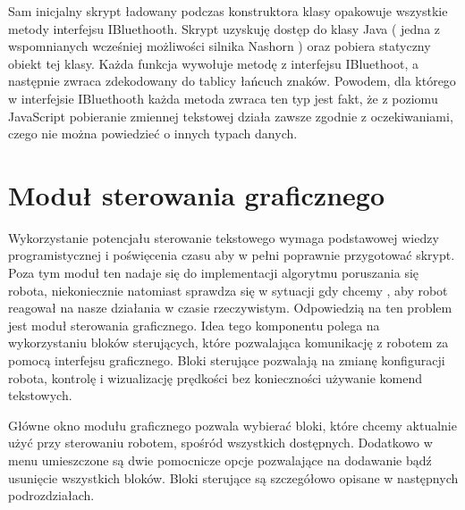 \documentclass[eng,printmode]{mgr}
\begin{document}
Sam inicjalny skrypt ładowany podczas konstruktora klasy opakowuje wszystkie metody interfejsu IBluethooth. Skrypt uzyskuję dostęp do klasy Java ( jedna z wspomnianych wcześniej możliwości silnika Nashorn ) oraz pobiera statyczny obiekt tej klasy. Każda funkcja wywołuje metodę z interfejsu  IBluethoot, a następnie zwraca zdekodowany do tablicy łańcuch znaków. Powodem, dla którego w interfejsie IBluethooth każda metoda zwraca ten typ jest fakt, że z poziomu JavaScript pobieranie zmiennej tekstowej działa zawsze zgodnie z oczekiwaniami, czego nie można powiedzieć o innych typach danych.

 \section{Moduł sterowania graficznego}

Wykorzystanie potencjału sterowanie tekstowego wymaga podstawowej wiedzy programistycznej i poświęcenia czasu aby w pełni poprawnie przygotować skrypt. Poza tym moduł ten nadaje się do implementacji algorytmu poruszania się robota, niekoniecznie natomiast sprawdza się w sytuacji gdy chcemy , aby robot reagował na nasze działania w czasie rzeczywistym. Odpowiedzią  na ten problem jest moduł sterowania graficznego. Idea tego komponentu polega na wykorzystaniu bloków sterujących, które pozwalająca komunikację z robotem za pomocą interfejsu graficznego. Bloki sterujące pozwalają na zmianę konfiguracji robota, kontrolę  i wizualizację prędkości bez konieczności używanie komend tekstowych. 

Główne okno modułu graficznego pozwala wybierać bloki, które chcemy aktualnie użyć przy sterowaniu robotem, spośród wszystkich dostępnych. Dodatkowo w menu umieszczone są dwie pomocnicze opcje pozwalające na dodawanie bądź usunięcie wszystkich bloków. Bloki sterujące są szczegółowo opisane w następnych podrozdziałach.
\end{document}
